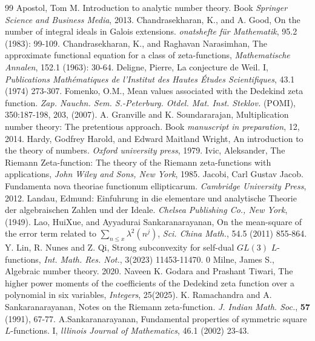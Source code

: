 \documentclass[preprint,12pt]{elsarticle}
\numberwithin{equation}{section}
\begin{document}
\begin{thebibliography}{99}
	 Apostol, Tom M. Introduction to analytic number theory. Book \emph{Springer Science and Business Media}, 2013.
	 Chandrasekharan, K., and A. Good, On the number of integral ideals in Galois extensions. \emph{onatshefte für Mathematik}, 95.2 (1983): 99-109.
	 Chandrasekharan, K., and Raghavan Narasimhan, The approximate functional equation for a class of zeta-functions, \emph{Mathematische Annalen}, 152.1 (1963): 30-64.
	 Deligne, Pierre, La conjecture de Weil. I, \emph{ Publications Mathématiques de l'Institut des Hautes Études Scientifiques}, 43.1 (1974) 273-307.
	 Fomenko, O.M., Mean values associated with the Dedekind zeta function. \emph{Zap. Nauchn. Sem. S.-Peterburg. Otdel. Mat. Inst. Steklov.} (POMI), 350:187-198, 203, (2007).
	 A. Granville and K. Soundararajan, Multiplication number theory: The pretentious approach. Book \emph{manuscript in preparation}, 12, 2014.
	 Hardy, Godfrey Harold, and Edward Maitland Wright, An introduction to the theory of numbers. \emph{Oxford university press}, 1979.
	 Ivic, Aleksander, The Riemann Zeta-function: The theory of the Riemann zeta-functions with applications, \emph{John Wiley and Sons, New York}, 1985.
	 Jacobi, Carl Gustav Jacob. Fundamenta nova theoriae functionum ellipticarum.
	\emph{Cambridge University Press}, 2012.
	 Landau, Edmund: Einfuhrung in die elementare und analytische Theorie der algebraischen Zahlen und der Ideale. \emph{Chelsea Publishing Co., New York}, (1949).
	 Lao, HuiXue, and Ayyadurai Sankaranarayanan, On the mean-square of the error term related to $ \sum_{n\leq x} \lambda^{2}(n^{j})$, \emph{Sci. China Math.}, 54.5 (2011) 855-864.
	 Y. Lin, R. Nunes and Z. Qi, Strong subconvexity for self-dual $GL(3)$ $L$-functions, \emph{Int. Math. Res. Not.}, 3(2023) 11453-11470. 0
	 Milne, James S., Algebraic number theory. 2020.
	 Naveen K. Godara and Prashant Tiwari, The higher power moments of the coefficients of the Dedekind zeta function over a polynomial in six variables, \emph{Integers}, 25(2025).
	 K. Ramachandra and A. Sankaranarayanan, Notes on the Riemann zeta-function. \emph{J. Indian Math. Soc.}, {\bf 57} (1991), 67-77.
	 A.Sankaranarayanan, Fundamental properties of symmetric square $ L $-functions. I, \emph{lllinois Journal of Mathematics}, 46.1 (2002) 23-43.
\end{thebibliography}
\end{document}
